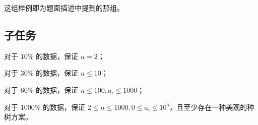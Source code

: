 这组样例即为题面描述中提到的那组。

\examplebox{}{}


\subsection*{子任务}

对于 $10\%$ 的数据，保证 $n=2$；

对于 $30\%$ 的数据，保证 $n\le 10$；

对于 $60\%$ 的数据，保证 $n\le 100,a_i\le 1000$；

对于 $1000\%$ 的数据，保证 $2\le n\le 1000,0\le a_i\le 10^5$，且至少存在一种美观的种树方案。